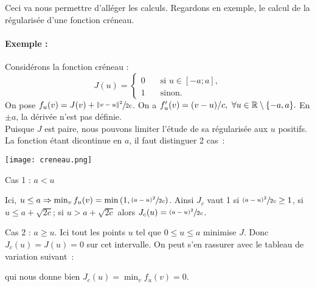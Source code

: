 \documentclass[main.tex]{subfiles}
\begin{document}
Ceci va nous permettre d'alléger les calculs. Regardons en exemple, le calcul de la régularisée d'une fonction créneau.

\begin{multicols}{2}
\paragraph{Exemple :} Considérons la fonction créneau :
$$J(u)= \left\{  \begin{aligned}
0 \quad & \textrm{si } u \in [-a;a], \\ 1 \quad & \textrm{sinon}. 
\end{aligned}   \right. $$
On pose $f_u(v) = J(v) + \sfrac{\| v-u \|^2}{2c}$.
On a $f'_u(v) = (v-u)/c, \ \forall u \in \mathbb{R} \setminus \{ -a, a \}. $
En $\pm a$, la dérivée n'est pas définie. \\
Puisque $J$ est paire, nous pouvons limiter l'étude de sa régularisée aux $u$ positifs. La fonction étant dicontinue en $a$, il faut distinguer 2 cas~:
\begin{center}
\texttt{[image: creneau.png]}
\end{center}
\end{multicols}
\begin{myitemize}
\renewcommand{\labelitemi}{\scriptsize$\bullet$} 
\item Cas 1 : $a < u$
\begin{center}
\end{center}
Ici, $u\leq a \Rightarrow \min_v f_u(v) = \min \left(1, \sfrac{(a-u)^2}{2c} \right)  $. Ainsi $J_c$ vaut 1 si $\sfrac{(a-u)^2}{2c} \geq 1$, \ie si $u\leq a+\sqrt{2c}$; si $u>a+\sqrt{2c}$ alors $J_c(u)=\sfrac{(a-u)^2}{2c}$.
\item Cas 2 : $ a \geq u$. Ici tout les points $u$ tel que $0\leq u \leq a$ minimise $J$. Donc $J_c(u)=J(u)=0$ sur cet intervalle. On peut s'en rassurer avec le tableau de variation suivant~:
\begin{center}
\end{center}
qui nous donne bien $J_c(u) = \min_v f_u(v) = 0$.
\end{myitemize}
\end{document}
